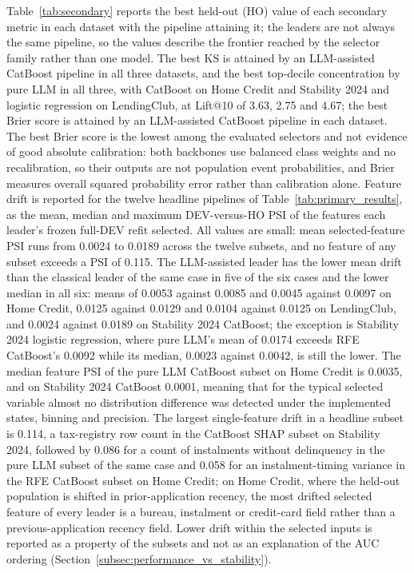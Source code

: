 \documentclass[final,5p,twocolumn]{elsarticle}
\begin{document}
Table~\ref{tab:secondary} reports the best held-out (HO) value of each secondary metric in each dataset with the pipeline attaining it; the leaders are not always the same pipeline, so the values describe the frontier reached by the selector family rather than one model. The best KS is attained by an LLM-assisted CatBoost pipeline in all three datasets, and the best top-decile concentration by pure LLM in all three, with CatBoost on Home Credit and Stability 2024 and logistic regression on LendingClub, at Lift@10 of 3.63, 2.75 and 4.67; the best Brier score is attained by an LLM-assisted CatBoost pipeline in each dataset. The best Brier score is the lowest among the evaluated selectors and not evidence of good absolute calibration: both backbones use balanced class weights and no recalibration, so their outputs are not population event probabilities, and Brier measures overall squared probability error rather than calibration alone. Feature drift is reported for the twelve headline pipelines of Table~\ref{tab:primary_results}, as the mean, median and maximum DEV-versus-HO PSI of the features each leader's frozen full-DEV refit selected. All values are small: mean selected-feature PSI runs from 0.0024 to 0.0189 across the twelve subsets, and no feature of any subset exceeds a PSI of 0.115. The LLM-assisted leader has the lower mean drift than the classical leader of the same case in five of the six cases and the lower median in all six: means of 0.0053 against 0.0085 and 0.0045 against 0.0097 on Home Credit, 0.0125 against 0.0129 and 0.0104 against 0.0125 on LendingClub, and 0.0024 against 0.0189 on Stability 2024 CatBoost; the exception is Stability 2024 logistic regression, where pure LLM's mean of 0.0174 exceeds RFE CatBoost's 0.0092 while its median, 0.0023 against 0.0042, is still the lower. The median feature PSI of the pure LLM CatBoost subset on Home Credit is 0.0035, and on Stability 2024 CatBoost 0.0001, meaning that for the typical selected variable almost no distribution difference was detected under the implemented states, binning and precision. The largest single-feature drift in a headline subset is 0.114, a tax-registry row count in the CatBoost SHAP subset on Stability 2024, followed by 0.086 for a count of instalments without delinquency in the pure LLM subset of the same case and 0.058 for an instalment-timing variance in the RFE CatBoost subset on Home Credit; on Home Credit, where the held-out population is shifted in prior-application recency, the most drifted selected feature of every leader is a bureau, instalment or credit-card field rather than a previous-application recency field. Lower drift within the selected inputs is reported as a property of the subsets and not as an explanation of the AUC ordering (Section~\ref{subsec:performance_vs_stability}).
\end{document}
